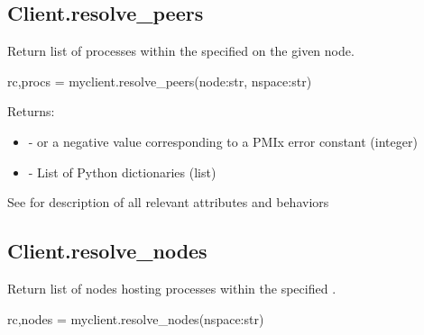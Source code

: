 \subsection{Client.resolve_peers}

\summary

Return list of processes within the specified  on the given node.

\format

\pyspecificstart
\begin{codepar}
rc,procs = myclient.resolve_peers(node:str, nspace:str)
\end{codepar}
\pyspecificend

\begin{arglist}
\end{arglist}

Returns:

\begin{itemize}
    \item {} -  or a negative value corresponding to a PMIx error constant (integer)
    \item {} - List of Python  dictionaries (list)
\end{itemize}


See  for description of all relevant attributes and behaviors


\subsection{Client.resolve_nodes}

\summary

Return list of nodes hosting processes within the specified .

\format

\pyspecificstart
\begin{codepar}
rc,nodes = myclient.resolve_nodes(nspace:str)
\end{codepar}
\pyspecificend

\begin{arglist}
\end{arglist}

